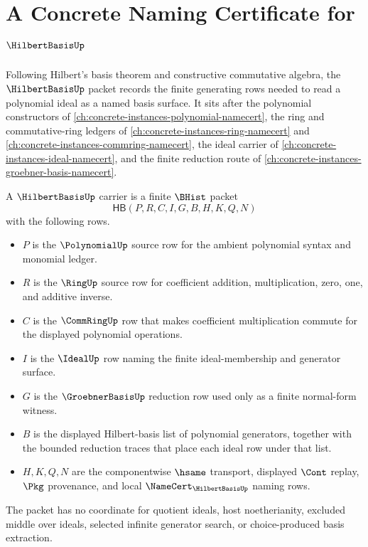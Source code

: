 \chapter{A Concrete Naming Certificate for $\HilbertBasisUp$}
\label{ch:concrete-instances-hilbert-basis-namecert}

Following Hilbert's basis theorem and constructive commutative algebra, the $\HilbertBasisUp$ packet records the finite generating rows needed to read a polynomial ideal as a named basis surface. It sits after the polynomial constructors of \autoref{ch:concrete-instances-polynomial-namecert}, the ring and commutative-ring ledgers of \autoref{ch:concrete-instances-ring-namecert} and \autoref{ch:concrete-instances-commring-namecert}, the ideal carrier of \autoref{ch:concrete-instances-ideal-namecert}, and the finite reduction route of \autoref{ch:concrete-instances-groebner-basis-namecert}.

\begin{definition}\label{def:hilbert-basis-carrier}
A $\HilbertBasisUp$ carrier is a finite $\BHist$ packet
$$
\mathsf{HB}(P,R,C,I,G,B,H,K,Q,N)
$$
with the following rows.
\begin{itemize}
\item $P$ is the $\PolynomialUp$ source row for the ambient polynomial syntax and monomial ledger.
\item $R$ is the $\RingUp$ source row for coefficient addition, multiplication, zero, one, and additive inverse.
\item $C$ is the $\CommRingUp$ row that makes coefficient multiplication commute for the displayed polynomial operations.
\item $I$ is the $\IdealUp$ row naming the finite ideal-membership and generator surface.
\item $G$ is the $\GroebnerBasisUp$ reduction row used only as a finite normal-form witness.
\item $B$ is the displayed Hilbert-basis list of polynomial generators, together with the bounded reduction traces that place each ideal row under that list.
\item $H,K,Q,N$ are the componentwise $\hsame$ transport, displayed $\Cont$ replay, $\Pkg$ provenance, and local $\NameCert_{\HilbertBasisUp}$ naming rows.
\end{itemize}
The packet has no coordinate for quotient ideals, host noetherianity, excluded middle over ideals, selected infinite generator search, or choice-produced basis extraction.
\end{definition}

